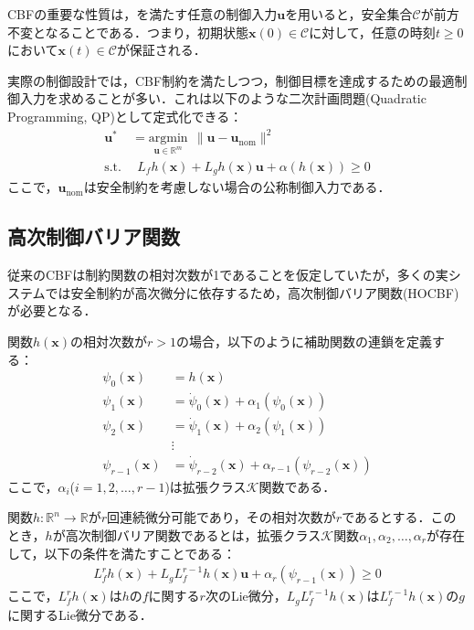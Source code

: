 CBFの重要な性質は，を満たす任意の制御入力$\mathbf{u}$を用いると，安全集合$\mathcal{C}$が前方不変となることである．つまり，初期状態$\mathbf{x}(0) \in \mathcal{C}$に対して，任意の時刻$t \geq 0$において$\mathbf{x}(t) \in \mathcal{C}$が保証される．

実際の制御設計では，CBF制約を満たしつつ，制御目標を達成するための最適制御入力を求めることが多い．これは以下のような二次計画問題(Quadratic Programming, QP)として定式化できる：
\begin{equation}
\begin{aligned}
\mathbf{u}^* &= \underset{\mathbf{u} \in \mathbb{R}^m}{\text{argmin}} \:\: \|\mathbf{u} - \mathbf{u}_{\text{nom}}\|^2 \\
\text{s.t.} & \:\: L_f h(\mathbf{x}) + L_g h(\mathbf{x})\mathbf{u} + \alpha(h(\mathbf{x})) \geq 0
\label{eq:cbf_qp}
\end{aligned}
\end{equation}
ここで，$\mathbf{u}_{\text{nom}}$は安全制約を考慮しない場合の公称制御入力である．

\subsection{高次制御バリア関数}

従来のCBFは制約関数の相対次数が1であることを仮定していたが，多くの実システムでは安全制約が高次微分に依存するため，高次制御バリア関数(HOCBF)が必要となる．

関数$h(\mathbf{x})$の相対次数が$r > 1$の場合，以下のように補助関数の連鎖を定義する：
\begin{equation}
\begin{aligned}
\psi_0(\mathbf{x}) &= h(\mathbf{x}) \\
\psi_1(\mathbf{x}) &= \dot{\psi}_0(\mathbf{x}) + \alpha_1(\psi_0(\mathbf{x})) \\
\psi_2(\mathbf{x}) &= \dot{\psi}_1(\mathbf{x}) + \alpha_2(\psi_1(\mathbf{x})) \\
&\vdots \\
\psi_{r-1}(\mathbf{x}) &= \dot{\psi}_{r-2}(\mathbf{x}) + \alpha_{r-1}(\psi_{r-2}(\mathbf{x}))
\label{eq:hocbf_psi}
\end{aligned}
\end{equation}
ここで，$\alpha_i$($i = 1, 2, \ldots, r-1$)は拡張クラス$\mathcal{K}$関数である．

\begin{dfn}[高次制御バリア関数]
関数$h: \mathbb{R}^n \rightarrow \mathbb{R}$が$r$回連続微分可能であり，その相対次数が$r$であるとする．このとき，$h$が高次制御バリア関数であるとは，拡張クラス$\mathcal{K}$関数$\alpha_1, \alpha_2, \ldots, \alpha_r$が存在して，以下の条件を満たすことである：
\begin{equation}
\begin{aligned}
L_f^r h(\mathbf{x}) + L_g L_f^{r-1} h(\mathbf{x})\mathbf{u} + \alpha_r(\psi_{r-1}(\mathbf{x})) \geq 0
\label{eq:hocbf_condition}
\end{aligned}
\end{equation}
ここで，$L_f^r h(\mathbf{x})$は$h$の$f$に関する$r$次のLie微分，$L_g L_f^{r-1} h(\mathbf{x})$は$L_f^{r-1} h(\mathbf{x})$の$g$に関するLie微分である．
\end{dfn}

